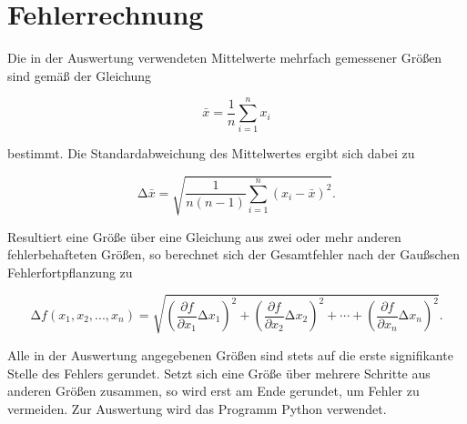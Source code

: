 \documentclass[
  bibliography=totoc,     %
  captions=tableheading,  %
  titlepage=firstiscover, %
]{scrartcl}
\begin{document}
\section{Fehlerrechnung}
\label{sec:fehlerrechnung}
Die in der Auswertung verwendeten Mittelwerte mehrfach gemessener Größen sind gemäß der
Gleichung

\begin{equation}
    \bar{x}=\frac{1}{n}\sum_{i=1}^n x_i
    \label{eqn:mittelwert}
\end{equation}

bestimmt. Die Standardabweichung des Mittelwertes ergibt sich dabei zu

\begin{equation}
    \mathup{\Delta}\bar{x}=\sqrt{\frac{1}{n(n-1)}\sum_{i=1}^n\left(x_i-\bar{x}\right)^2}.
    \label{eqn:standardabweichung}
\end{equation}

Resultiert eine Größe über eine Gleichung aus zwei oder mehr anderen fehlerbehafteten Größen, so
berechnet sich der Gesamtfehler nach der Gaußschen Fehlerfortpflanzung zu

\begin{equation}
    \mathup{\Delta}f(x_1,x_2,...,x_n)=\sqrt{\left(\frac{\partial f}{\partial x_1}\mathup{\Delta}x_1\right)^2+\left(\frac{\partial f}{\partial x_2}\mathup{\Delta}x_2\right)^2+ \dotsb +\left(\frac{\partial f}{\partial x_n}\mathup{\Delta}x_n\right)^2}.
    \label{eqn:fehlerfortpflanzung}
\end{equation}

Alle in der Auswertung angegebenen Größen sind stets auf die erste signifikante Stelle des
Fehlers gerundet. Setzt sich eine Größe über mehrere Schritte aus anderen Größen zusammen,
so wird erst am Ende gerundet, um Fehler zu vermeiden. Zur Auswertung wird das Programm Python verwendet.
\end{document}
